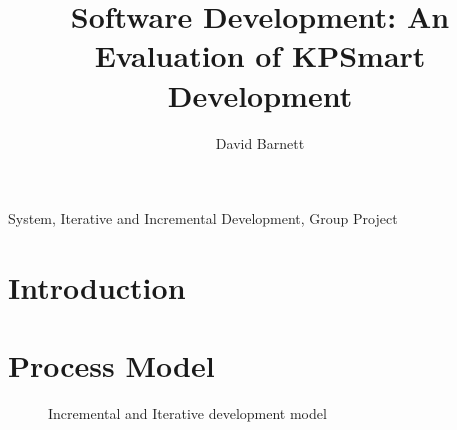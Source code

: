 \documentclass{style/CRPITStyle}
\begin{document}
\title{Software Development: An Evaluation of KPSmart Development}
\author{David Barnett}

\maketitle

\begin{abstract}
\end{abstract}

\vspace{.1in}

\/ System, Iterative and Incremental Development, Group Project

\vspace{.1in}

\section{Introduction}

\section{Process Model}


\begin{figure}[htb]
\caption{\protect\label{s-system} Incremental and Iterative development model }
\end{figure}

\end{document}
